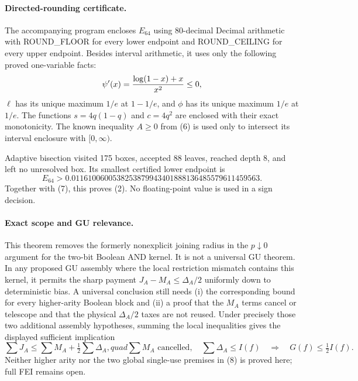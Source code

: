 \paragraph{Directed-rounding certificate.}
The accompanying program encloses $E_{64}$ using 80-decimal Decimal
arithmetic with ROUND\_FLOOR for every lower endpoint and ROUND\_CEILING
for every upper endpoint.  Besides interval arithmetic, it uses only the
following proved one-variable facts:
\[
 \psi'(x)={\log(1-x)+x\over x^2}\le0,
\]
$\ell$ has its unique maximum $1/e$ at $1-1/e$, and $\phi$ has its unique
maximum $1/e$ at $1/e$.  The functions $s=4q(1-q)$ and $c=4q^2$ are
enclosed with their exact monotonicity.  The known inequality $A\ge0$ from
(6) is used only to intersect its interval enclosure with $[0,\infty)$.

Adaptive bisection visited 175 boxes, accepted 88 leaves, reached depth 8,
and left no unresolved box.  Its smallest certified lower endpoint is
\[
 E_{64}>0.0116100600538253879943401888136485579611459563.
\]
Together with (7), this proves (2).  No floating-point value is used in a
sign decision.

\paragraph{Exact scope and GU relevance.}
This theorem removes the formerly nonexplicit joining radius in the
$p\downarrow0$ argument for the two-bit Boolean AND kernel.  It is not a
universal GU theorem.  In any proposed GU assembly where the local
restriction mismatch contains this kernel, it permits the sharp payment
$J_A-M_A\le\Delta_A/2$ uniformly down to deterministic bias.  A universal
conclusion still needs (i) the corresponding bound for every higher-arity
Boolean block and (ii) a proof that the $M_A$ terms cancel or telescope and
that the physical $\Delta_A/2$ taxes are not reused.  Under precisely those
two additional assembly hypotheses, summing the local inequalities gives
the displayed sufficient implication
\[
 \sum J_A\le\sum M_A+\tfrac12\sum\Delta_A,quad
 \sum M_A\text{ cancelled},\quad \sum\Delta_A\le I(f)
 \quad\Longrightarrow\quad G(f)\le\tfrac12 I(f).       \tag{8}
\]
Neither higher arity nor the two global single-use premises in (8) is
proved here; full FEI remains open.

